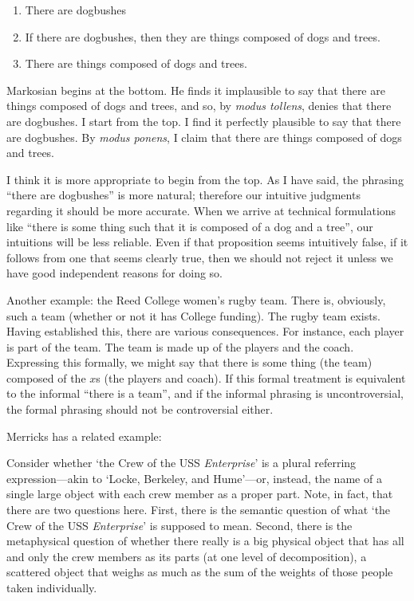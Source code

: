 \documentclass[11pt]{article}
\newenvironment{squote}{%
\begin{spacing}{1}
       	\begin{list}{}{%
\setlength{\labelwidth}{0pt}%
\rightmargin\leftmargin%
}
\item\relax
}{%
\end{list}%
\end{spacing}
}
\begin{document}
\begin{spacing}{1.25}
\begin{enumerate}
  \item There are dogbushes
  \item If there are dogbushes, then they are things composed of dogs
    and trees.
  \item There are things composed of dogs and trees.
\end{enumerate}

Markosian begins at the bottom.  He finds it implausible to say that
there are things composed of dogs and trees, and so, by {\em modus
  tollens}, denies that there are dogbushes.  I start from the top.  I
find it perfectly plausible to say that there are dogbushes.  By {\em
  modus ponens}, I claim that there are things composed of dogs and
trees.

I think it is more appropriate to begin from the top.  As I have said,
the phrasing ``there are dogbushes'' is more natural; therefore our
intuitive judgments regarding it should be more accurate.  When we
arrive at technical formulations like ``there is some thing such that
it is composed of a dog and a tree'', our intuitions will be less
reliable.  Even if that proposition seems intuitively false, if it
follows from one that seems clearly true, then we should not reject
it unless we have good independent reasons for doing so.

Another example: the Reed College women's rugby team.  There is,
obviously, such a team (whether or not it has College funding).  The
rugby team exists.  Having established this, there are various
consequences.  For instance, each player is part of the team.  The
team is made up of the players and the coach.  Expressing this
formally, we might say that there is some thing (the team) composed of
the $x$s (the players and coach).  If this formal treatment is
equivalent to the informal ``there is a team'', and if the informal
phrasing is uncontroversial, the formal phrasing should not be
controversial either.

Merricks has a related example:

\begin{squote}
Consider whether `the Crew of the USS {\em Enterprise}' is a plural
referring expression---akin to `Locke, Berkeley, and Hume'---or,
instead, the name of a single large object with each crew member as a
proper part.  Note, in fact, that there are two questions here.
First, there is the semantic question of what `the Crew of the USS
{\em Enterprise}' is supposed to mean.  Second, there is the
metaphysical question of whether there really is a big physical object
that has all and only the crew members as its parts (at one level of
decomposition), a scattered object that weighs as much as the sum of
the weights of those people taken individually.


\end{squote}
\end{spacing}
\end{document}
